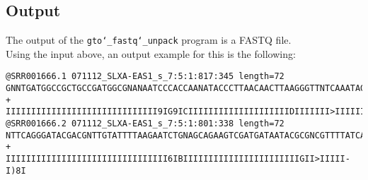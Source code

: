 \subsection*{Output}
The output of the \texttt{gto\char`_fastq\char`_unpack} program is a FASTQ file.\\
Using the input above, an output example for this is the following:
\begin{lstlisting}
@SRR001666.1 071112_SLXA-EAS1_s_7:5:1:817:345 length=72
GNNTGATGGCCGCTGCCGATGGCGNANAATCCCACCAANATACCCTTAACAACTTAAGGGTTNTCAAATAGA
+
IIIIIIIIIIIIIIIIIIIIIIIIIIIIII9IG9ICIIIIIIIIIIIIIIIIIIIIDIIIIIII>IIIIII/
@SRR001666.2 071112_SLXA-EAS1_s_7:5:1:801:338 length=72
NTTCAGGGATACGACGNTTGTATTTTAAGAATCTGNAGCAGAAGTCGATGATAATACGCGNCGTTTTATCAN
+
IIIIIIIIIIIIIIIIIIIIIIIIIIIIIIII6IBIIIIIIIIIIIIIIIIIIIIIIIGII>IIIII-I)8I
\end{lstlisting}
